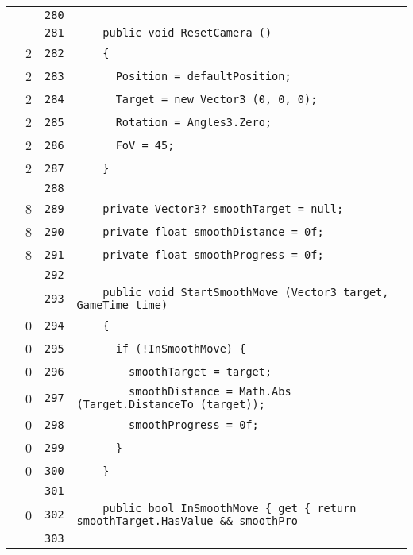 \documentclass[a4paper,10pt]{article}
\begin{document}
\begin{longtable}[l]{lrrl}
\cellcolor{gray} &  & \verb~280~ & \verb~~\\
\cellcolor{gray} &  & \verb~281~ & \verb~    public void ResetCamera ()~\\
\cellcolor{green} & 2 & \verb~282~ & \verb~    {~\\
\cellcolor{green} & 2 & \verb~283~ & \verb~      Position = defaultPosition;~\\
\cellcolor{green} & 2 & \verb~284~ & \verb~      Target = new Vector3 (0, 0, 0);~\\
\cellcolor{green} & 2 & \verb~285~ & \verb~      Rotation = Angles3.Zero;~\\
\cellcolor{green} & 2 & \verb~286~ & \verb~      FoV = 45;~\\
\cellcolor{green} & 2 & \verb~287~ & \verb~    }~\\
\cellcolor{gray} &  & \verb~288~ & \verb~~\\
\cellcolor{green} & 8 & \verb~289~ & \verb~    private Vector3? smoothTarget = null;~\\
\cellcolor{green} & 8 & \verb~290~ & \verb~    private float smoothDistance = 0f;~\\
\cellcolor{green} & 8 & \verb~291~ & \verb~    private float smoothProgress = 0f;~\\
\cellcolor{gray} &  & \verb~292~ & \verb~~\\
\cellcolor{gray} &  & \verb~293~ & \verb~    public void StartSmoothMove (Vector3 target, GameTime time)~\\
\cellcolor{red} & 0 & \verb~294~ & \verb~    {~\\
\cellcolor{red} & 0 & \verb~295~ & \verb~      if (!InSmoothMove) {~\\
\cellcolor{red} & 0 & \verb~296~ & \verb~        smoothTarget = target;~\\
\cellcolor{red} & 0 & \verb~297~ & \verb~        smoothDistance = Math.Abs (Target.DistanceTo (target));~\\
\cellcolor{red} & 0 & \verb~298~ & \verb~        smoothProgress = 0f;~\\
\cellcolor{red} & 0 & \verb~299~ & \verb~      }~\\
\cellcolor{red} & 0 & \verb~300~ & \verb~    }~\\
\cellcolor{gray} &  & \verb~301~ & \verb~~\\
\cellcolor{red} & 0 & \verb~302~ & \verb~    public bool InSmoothMove { get { return smoothTarget.HasValue && smoothPro~\\
\cellcolor{gray} &  & \verb~303~ & \verb~~\\

\end{longtable}
\end{document}
